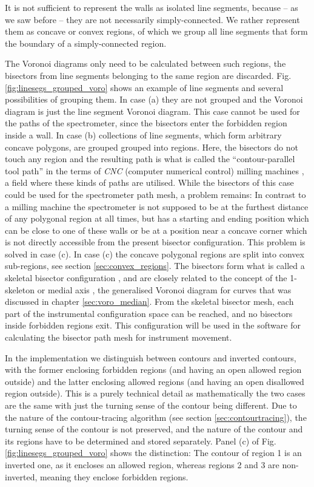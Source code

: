 It is not sufficient to represent the walls as isolated line segments, because -- 
as we saw before -- they are not necessarily simply-connected. 
We rather represent them as concave or convex regions, of which we group all 
line segments that form the boundary of a simply-connected region.

The Voronoi diagrams only need to be calculated between such regions, 
the bisectors from line segments belonging to the same region are discarded. 
Fig. \ref{fig:linesegs_grouped_voro} shows an example of line segments and several
possibilities of grouping them. 
In case (a) they are not grouped and the Voronoi diagram is just the line 
segment Voronoi diagram. This case cannot be used for the paths of the spectrometer,
since the bisectors enter the forbidden region inside a wall.
In case (b) collections of line segments, which form arbitrary concave polygons, 
are grouped grouped into regions. Here, the bisectors do not touch any region 
and the resulting path is what is called the ``contour-parallel tool path'' in 
the terms of \textit{CNC} (computer numerical control) milling machines \cite{Jeong1998, wiki_milling}, 
a field where these kinds of paths are utilised. While the bisectors of this case could 
be used for the spectrometer path mesh, a problem remains: In contrast to a milling
machine the spectrometer is not supposed to be at the furthest distance of any
polygonal region at all times, but has a starting and ending position which can 
be close to one of these walls or be at a position near a concave corner which
is not directly accessible from the present bisector configuration. This problem
is solved in case (c).
In case (c) the concave polygonal regions are split into convex sub-regions, see
section \ref{sec:convex_regions}.
The bisectors form what is called a skeletal bisector configuration \cite{Jeong1998, Couprie2007},
and are closely related to the concept of the 1-skeleton or medial axis 
\cite[p. 111]{Boissonnat2006}, the generalised Voronoi diagram for curves that was 
discussed in chapter \ref{sec:voro_median}.
From the skeletal bisector mesh, each part of the instrumental configuration space 
can be reached, and no bisectors inside forbidden regions exit. 
This configuration will be used in the software for calculating the bisector 
path mesh for instrument movement.

In the implementation we distinguish between contours and inverted contours, with 
the former enclosing forbidden regions (and having an open allowed region outside) 
and the latter enclosing allowed regions (and having an open disallowed region outside).
This is a purely technical detail as mathematically the two cases are the same
with just the turning sense of the contour being different. 
Due to the nature of the contour-tracing algorithm (see section \ref{sec:contourtracing}), 
the turning sense of the contour is not preserved, and the nature of the contour 
and its regions have to be determined and stored separately.
Panel (c) of Fig. \ref{fig:linesegs_grouped_voro} shows the distinction: 
The contour of region 1 is an inverted one, as it encloses an allowed region,
whereas regions 2 and 3 are non-inverted, meaning they enclose forbidden regions.

